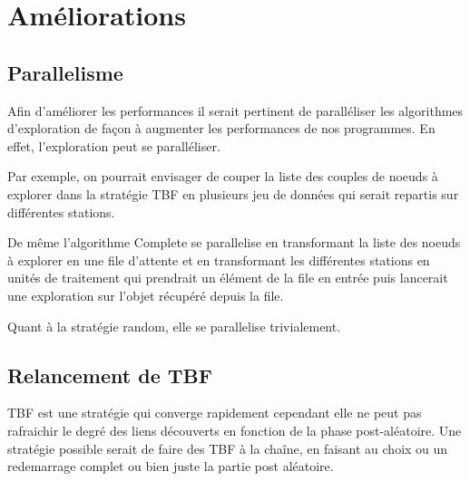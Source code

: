 \section{Améliorations}

\subsection{Parallelisme}

Afin d'améliorer les performances il serait pertinent
de paralléliser les algorithmes d'exploration de façon à augmenter les performances
de nos programmes. En effet, l'exploration peut se paralléliser.

Par exemple, on pourrait
envisager de couper la liste des couples de noeuds à explorer dans la stratégie TBF en
plusieurs jeu de données qui serait repartis sur différentes stations.

De même l'algorithme Complete se parallelise en transformant la liste des noeuds à explorer
en une file d'attente et en transformant les différentes stations en unités de traitement qui prendrait
un élément de la file en entrée puis lancerait une exploration sur l'objet récupéré depuis la file.

Quant à la stratégie random, elle se parallelise trivialement.

\subsection{Relancement de TBF}

TBF est une stratégie qui converge rapidement cependant elle ne peut pas rafraichir le degré des liens
découverts en fonction de la phase post-aléatoire. Une stratégie possible serait de faire des TBF à la chaîne,
en faisant au choix ou un redemarrage complet ou bien juste la partie post aléatoire.
